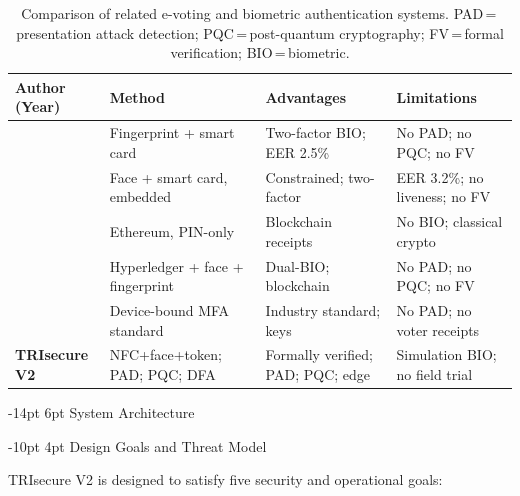 \documentclass[a4paper,12pt]{article}
\makeatletter
\renewcommand\section{\@startsection{section}{1}{\z@}%
  {-14pt \@plus -4pt \@minus -2pt}{6pt \@plus 2pt}%
  {\normalfont\large\bfseries}}
\renewcommand\subsection{\@startsection{subsection}{2}{\z@}%
  {-10pt \@plus -3pt \@minus -2pt}{4pt \@plus 2pt}%
  {\normalfont\normalsize\itshape}}
\newcommand{\textcite}[1]{\citet{#1}}
\newcommand{\botrule}{\bottomrule}
\makeatother
\begin{document}
\begin{table}[htbp]
\caption{Comparison of related e-voting and biometric authentication
  systems. PAD\,=\,presentation attack detection;
  PQC\,=\,post-quantum cryptography; FV\,=\,formal verification;
  BIO\,=\,biometric.}
\label{tab:related_comparison}
\small
\begin{tabular}{p{2.5cm}p{3.0cm}p{3.9cm}p{3.1cm}}
  \toprule
  \textbf{Author (Year)} & \textbf{Method} &
  \textbf{Advantages} & \textbf{Limitations} \\
  \midrule
  \textcite{bello2021biometric}
    & Fingerprint + smart card
    & Two-factor BIO; EER 2.5\%
    & No PAD; no PQC; no FV \\[2pt]
  \textcite{sanchez2020biometric}
    & Face + smart card, embedded
    & Constrained; two-factor
    & EER 3.2\%; no liveness; no FV \\[2pt]
  \textcite{ayed2017conceptual}
    & Ethereum, PIN-only
    & Blockchain receipts
    & No BIO; classical crypto \\[2pt]
  \textcite{faruk2024transforming}
    & Hyperledger + face + fingerprint
    & Dual-BIO; blockchain
    & No PAD; no PQC; no FV \\[2pt]
  \citet{fido2_webauthn}
    & Device-bound MFA standard
    & Industry standard; keys
    & No PAD; no voter receipts \\[2pt]
  \textbf{TRIsecure V2}
    & NFC+face+token; PAD; PQC; DFA
    & Formally verified; PAD; PQC; edge
    & Simulation BIO; no field trial \\
  \botrule
\end{tabular}
\end{table}

\section{System Architecture}\label{sec:architecture}

\subsection{Design Goals and Threat Model}

TRIsecure V2 is designed to satisfy five security and operational goals:
\end{document}
